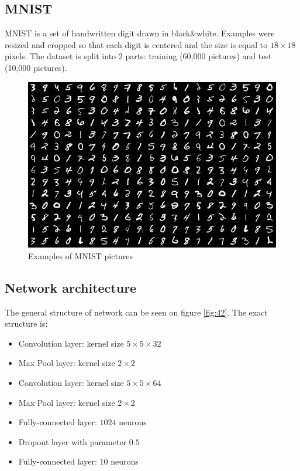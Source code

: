 \documentclass[licencjacka]{pracamgr}
\begin{document}
 		\subsection{MNIST}
 			MNIST is a set of handwritten digit drawn in black\&white. Examples were resized and cropped so that each digit is centered and the size is equal to $18\times18$ pixels. The dataset is split into 2 parts: training (60,000 pictures) and test (10,000 pictures).
 			\begin{figure}[h]
				\caption{Examples of MNIST pictures}
				\centering
				\includegraphics[width=\textwidth]{images/mnist}
			\end{figure}
 		\subsection{Network architecture}
 		The general structure of network can be seen on figure \ref{fig:42}. The exact structure is:
 			\begin{itemize}
 			\item Convolution layer: kernel size $5 \times 5 \times 32$
 			\item Max Pool layer: kernel size $2 \times 2$
 			\item Convolution layer: kernel size $5 \times 5 \times 64$
 			\item Max Pool layer: kernel size $2 \times 2$
 			\item Fully-connected layer: $1024$ neurons
 			\item Dropout layer with parameter $0.5$
 			\item Fully-connected layer: $10$ neurons
 			\end{itemize}
\end{document}
